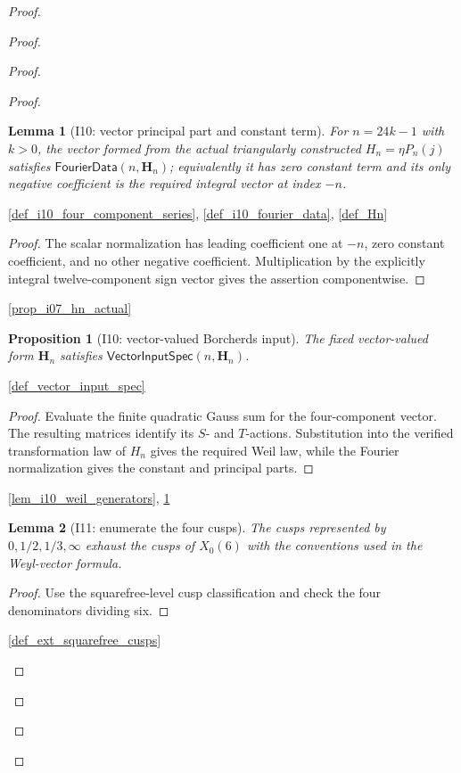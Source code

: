 \documentclass[11pt,a4paper]{article}
\numberwithin{equation}{section}
\theoremstyle{plain}\newtheorem{theorem}{Theorem}[section]\newaliascnt{proposition}{theorem}\newtheorem{proposition}[proposition]{Proposition}\aliascntresetthe{proposition}\newaliascnt{lemma}{theorem}\newtheorem{lemma}[lemma]{Lemma}\aliascntresetthe{lemma}
\theoremstyle{definition}\newaliascnt{definition}{theorem}\newtheorem{definition}[definition]{Definition}\aliascntresetthe{definition}\newaliascnt{notation}{theorem}\newtheorem{notation}[notation]{Notation}\aliascntresetthe{notation}
\providecommand{\lean}[1]{}\providecommand{\leanok}{}
\begin{document}
\begin{proof}
\begin{proof}
\begin{proof}
\begin{proof}
\begin{lemma}[I10: vector principal part and constant term]\label{lem_i10_vector_fourier_data}\lean{SptCM.Analytic.Repaired.auxiliaryHn_fourComponent_fourierData}\leanok
For \(n=24k-1\) with \(k>0\), the vector formed from the actual
triangularly constructed \(H_n=\eta P_n(j)\) satisfies
\(\mathsf{FourierData}(n,\mathbf H_n)\); equivalently it has zero constant
term and its only negative coefficient is the required integral vector at
index \(-n\).
\end{lemma}
\begin{uses-statement}\ref{def_i10_four_component_series}, \ref{def_i10_fourier_data}, \ref{def_Hn}\end{uses-statement}
\begin{proof}
The scalar normalization has leading coefficient one at \(-n\), zero
constant coefficient, and no other negative coefficient.  Multiplication by
the explicitly integral twelve-component sign vector gives the assertion
componentwise.
\end{proof}
\begin{uses-proof}\ref{prop_i07_hn_actual}\end{uses-proof}

\begin{proposition}[I10: vector-valued Borcherds input]\label{prop_i10_vector_input}\lean{SptCM.Analytic.Repaired.auxiliaryHn_vectorInputSpec}\leanok
The fixed vector-valued form $\mathbf H_n$ satisfies $\mathsf{VectorInputSpec}(n,\mathbf H_n)$.
\end{proposition}
\begin{uses-statement}\ref{def_vector_input_spec}\end{uses-statement}
\begin{proof}
Evaluate the finite quadratic Gauss sum for the four-component vector.  The resulting matrices identify its $S$- and $T$-actions.  Substitution into the verified transformation law of $H_n$ gives the required Weil law, while the Fourier normalization gives the constant and principal parts.
\end{proof}
\begin{uses-proof}\ref{lem_i10_weil_generators}, \ref{lem_i10_vector_fourier_data}\end{uses-proof}

\begin{lemma}[I11: enumerate the four cusps]\label{lem_i11_cusp_exhaustion}\lean{SptCM.Analytic.Repaired.levelSix_cusp_exhaustion}\leanok
The cusps represented by $0,1/2,1/3,\infty$ exhaust the cusps of $X_0(6)$ with the conventions used in the Weyl-vector formula.
\end{lemma}
\begin{proof}Use the squarefree-level cusp classification and check the four denominators dividing six.\end{proof}
\begin{uses-proof}\ref{def_ext_squarefree_cusps}\end{uses-proof}


\end{proof}
\end{proof}
\end{proof}
\end{proof}
\end{document}
